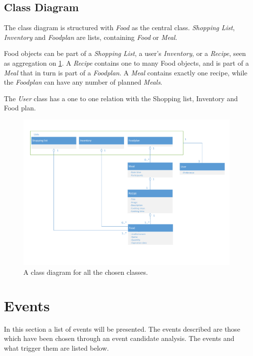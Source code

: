 \subsection{Class Diagram}
The class diagram is structured with \textit{Food} as the central class. 
\textit{Shopping List}, \textit{Inventory} and \textit{Foodplan} are lists, containing \textit{Food} or \textit{Meal}.

Food objects can be part of a \textit{Shopping List}, a user's \textit{Inventory}, or a \textit{Recipe}, seen as aggregation on \cref{fig:classDiagram}. A \textit{Recipe} contains one to many Food objects, and is part of a \textit{Meal} that in turn is part of a \textit{Foodplan}. A \textit{Meal} contains exactly one recipe, while the \textit{Foodplan} can have any number of planned \textit{Meals}.

The \textit{User} class has a one to one relation with the Shopping list, Inventory and Food plan.
\begin{figure}[H]
	\centering
	\includegraphics[clip=true, width=1\textwidth, trim=1cm 3cm 3cm 0]{Grafik/FoodPlanner/Klasseting}
	\caption{A class diagram for all the chosen classes.}
	\label{fig:classDiagram}
\end{figure}

\section{Events} \label{EventsSection}
In this section a list of events will be presented. The events described are those which have been chosen through an event candidate analysis. The events and what trigger them are listed below.

